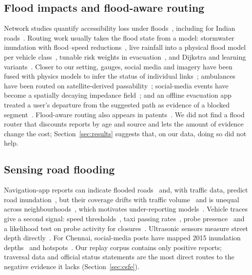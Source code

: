 \documentclass[conference]{IEEEtran}
\begin{document}
\subsection{Flood impacts and flood-aware routing}
Network studies quantify accessibility loss under floods~\cite{yin2016shanghai,coles2017york,green2017emergency,kasmalkar2020floods,zhou2022connectivity}, including for Indian roads~\cite{singh2018vulnerability}. Routing work usually takes the flood state from a model: stormwater inundation with flood--speed reductions~\cite{defaria2026routing}, live rainfall into a physical flood model per vehicle class~\cite{panakkal2023safer}, tunable risk weights in evacuation~\cite{jao2025float}, and Dijkstra and learning variants~\cite{li2023dijkstra,li2025drl}. Closer to our setting, gauges, social media and imagery have been fused with physics models to infer the status of individual links~\cite{panakkal2024eyes}; ambulances have been routed on satellite-derived passability~\cite{lupa2026stars}; social-media events have become a spatially decaying impedance field~\cite{fu2026social}; and an offline evacuation app treated a user's departure from the suggested path as evidence of a blocked segment~\cite{itoi2017offline}. Flood-aware routing also appears in patents~\cite{ibm2013patent,uber2020patent}. We did not find a flood router that discounts reports by age and source and lets the amount of evidence change the cost; Section~\ref{sec:results} suggests that, on our data, doing so did not help.

\subsection{Sensing road flooding}
Navigation-app reports can indicate flooded roads~\cite{praharaj2021waze,safaei2023waze} and, with traffic data, predict road inundation~\cite{yuan2023predicting}, but their coverage drifts with traffic volume~\cite{liu2023wazecoverage} and is unequal across neighbourhoods~\cite{esparza2023imbalance}, which motivates under-reporting models~\cite{agostini2024underreport}. Vehicle traces give a second signal: speed thresholds~\cite{hu2018fcd}, taxi passing rates~\cite{kong2022taxi}, probe presence~\cite{hiramoto2025probe} and a likelihood test on probe activity for closures~\cite{pietrobon2019closure}. Ultrasonic sensors measure street depth directly~\cite{mydlarz2024floodnet}. For Chennai, social-media posts have mapped 2015 inundation depths~\cite{karmegam2021chennai} and hotspots~\cite{sattaru2021utilizing}. Our replay corpus contains only positive reports; traversal data and official status statements are the most direct routes to the negative evidence it lacks (Section~\ref{sec:csfe}).
\end{document}
